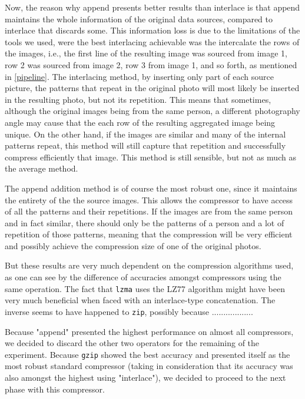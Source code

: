 \documentclass[12pt]{article}
\begin{document}
Now, the reason why append presents better results than interlace is that append maintains the whole information of the original data sources, compared to interlace that discards some. This information loss is due to the limitations of the tools we used, were the best interlacing achievable was the intercalate the rows of the images, i.e., the first line of the resulting image was sourced from image 1, row 2 was sourced from image 2, row 3 from image 1, and so forth, as mentioned in \ref{pipeline}. The interlacing method, by inserting only part of each source picture, the patterns that repeat in the original photo will most likely be inserted in the resulting photo, but not its repetition. This means that sometimes, although the original images being from the same person, a different photography angle may cause that the each row of the resulting aggregated image being unique. On the other hand, if the images are similar and many of the internal patterns repeat, this method will still capture that repetition and successfully compress efficiently that image. This method is still sensible, but not as much as the average method.

The append addition method is of course the most robust one, since it maintains the entirety of the the source images. This allows the compressor to have access of all the patterns and their repetitions. If the images are from the same person and in fact similar, there should only be the patterns of a person and a lot of repetition of those patterns, meaning that the compression will be very efficient and possibly achieve the compression size of one of the original photos.

But these results are very much dependent on the compression algorithms used, as one can see by the difference of accuracies amongst compressors using the same operation.
The fact that \texttt{lzma} uses the LZ77 algorithm  might have been very much beneficial when faced with an interlace-type concatenation.
The inverse seems to have happened to \texttt{zip}, possibly because ..................

Because "append" presented the highest performance on almost all compressors, we decided to discard the other two operators for the remaining of the experiment.
Because \texttt{gzip} showed the best accuracy and presented itself as the most robust standard compressor (taking in consideration that its accuracy was also
amongst the highest using "interlace"), we decided to proceed to the next phase with this compressor.
\newline 
\end{document}
